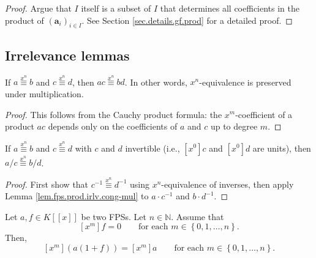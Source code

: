 \begin{proof}
Argue that $I$ itself is a subset of $I$ that determines all coefficients in
the product of $\left(\mathbf{a}_{i}\right)_{i\in I}$. See Section
\ref{sec.details.gf.prod} for a detailed proof.
\end{proof}

\subsection{Irrelevance lemmas}

\begin{lemma}
\label{lem.fps.prod.irlv.cong-mul}
\leanhelper
\leanok
If $a\overset{x^n}{\equiv} b$ and $c\overset{x^n}{\equiv} d$, then
$ac\overset{x^n}{\equiv} bd$.
In other words, $x^n$-equivalence is preserved under multiplication.
\end{lemma}

\begin{proof}
\leanok
This follows from the Cauchy product formula: the $x^m$-coefficient of a
product $ac$ depends only on the coefficients of $a$ and $c$ up to degree $m$.
\end{proof}

\begin{lemma}
\label{lem.fps.prod.irlv.cong-div}
\leanhelper
\leanok
If $a\overset{x^n}{\equiv} b$ and $c\overset{x^n}{\equiv} d$ with
$c$ and $d$ invertible (i.e., $[x^0]c$ and $[x^0]d$ are units), then
$a/c \overset{x^n}{\equiv} b/d$.
\end{lemma}

\begin{proof}
\leanok
First show that $c^{-1}\overset{x^n}{\equiv} d^{-1}$ using
$x^n$-equivalence of inverses, then apply Lemma
\ref{lem.fps.prod.irlv.cong-mul} to $a\cdot c^{-1}$ and $b\cdot d^{-1}$.
\end{proof}

\begin{lemma}
\label{lem.fps.prod.irlv.1}
\leantarget
\leanok
Let $a,f\in K\left[\left[x\right]\right]$ be two FPSs. Let $n\in\mathbb{N}$.
Assume that
\[
\left[x^{m}\right]f=0 \qquad\text{for each }m\in\left\{0,1,\ldots,n\right\}.
\]
Then,
\[
\left[x^{m}\right]\left(a\left(1+f\right)\right)=\left[x^{m}\right]a
\qquad\text{for each }m\in\left\{0,1,\ldots,n\right\}.
\]
\end{lemma}

